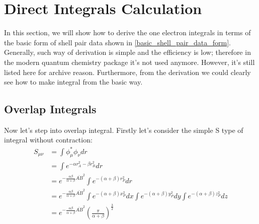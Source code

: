 % 
%
%
%

\section{Direct Integrals Calculation}
%
%
%
%
In this section, we will show how to derive the one electron integrals in terms of the 
basic form of shell pair data shown in \ref{basic_shell_pair_data_form}. Generally, such
way of derivation is simple and the efficiency is low; therefore in the modern quantum 
chemistry package it's not used anymore. However, it's still listed here for archive reason.
Furthermore, from the derivation we could clearly see how to make integral from the basic
way.

\subsection{Overlap Integrals}
%
%
%
%
Now let's step into overlap integral. Firstly let's consider the simple S type of integral 
without contraction:
\begin{equation}
 \label{overlap_direct_int_eq:1}
\begin{split}
S_{\mu\nu}  &= \int \phi_{\mu}^{*}\phi_{\nu} dr \\
&= \int e^{-\alpha r_{A}^{2} - \beta r_{B}^{2}} dr \\
&= e^{-\frac{\alpha\beta}{\alpha+\beta}\overline{AB}^{2}}\int e^{-(\alpha+\beta)r_{P}^{2}} dr \\
&= e^{-\frac{\alpha\beta}{\alpha+\beta}\overline{AB}^{2}} \int e^{-(\alpha+\beta)x_{P}^{2}} dx
\int e^{-(\alpha+\beta)y_{P}^{2}} dy \int e^{-(\alpha+\beta)z_{P}^{2}} dz \\
&= e^{-\frac{\alpha\beta}{\alpha+\beta}\overline{AB}^{2}}\left( \frac{\pi}{\alpha+\beta}\right)
^{\frac{3}{2}}   
\end{split}
\end{equation}

